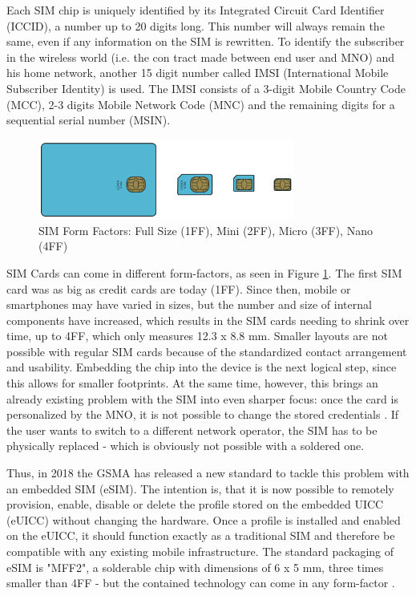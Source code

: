 Each SIM chip is uniquely identified by its Integrated Circuit Card Identifier (ICCID), a number up to 20 digits long. This number will always remain the same, even if any information on the SIM is rewritten. To identify the subscriber in the wireless world (i.e. the con tract made between end user and MNO) and his home network, another 15 digit number called IMSI (International Mobile Subscriber Identity) is used. The IMSI consists of a 3-digit Mobile Country Code (MCC), 2-3 digits Mobile Network Code (MNC) and the remaining digits for a sequential serial number (MSIN).

\begin{figure}[ht]
    \centering
    \includegraphics[width=0.75\textwidth]{pictures/sim_form_factors.png}
    \caption{SIM Form Factors: Full Size (1FF), Mini (2FF), Micro (3FF), Nano (4FF) \parencite{pic:SIMFormfactor}}
    \label{fig:sim-formfactors}
\end{figure}

SIM Cards can come in different form-factors, as seen in Figure \ref{fig:sim-formfactors}. The first SIM card was as big as credit cards are today (1FF). Since then, mobile or smartphones may have varied in sizes, but the number and size of internal components have increased, which results in the SIM cards needing to shrink over time, up to 4FF, which only measures 12.3 x 8.8 mm. Smaller layouts are not possible with regular SIM cards because of the standardized contact arrangement and usability. Embedding the chip into the device is the next logical step, since this allows for smaller footprints. At the same time, however, this brings an already existing problem with the SIM into even sharper focus: once the card is personalized by the MNO, it is not possible to change the stored credentials \parencite{Meyer:eSIMOverview}. If the user wants to switch to a different network operator, the SIM has to be physically replaced - which is obviously not possible with a soldered one. 

Thus, in 2018 the GSMA has released a new standard to tackle this problem with an embedded SIM (eSIM). The intention is, that it is now possible to remotely provision, enable, disable or delete the profile stored on the embedded UICC (eUICC) without changing the hardware. Once a profile is installed and enabled on the eUICC, it should function exactly as a traditional SIM and therefore be compatible with any existing mobile infrastructure. The standard packaging of eSIM is "MFF2", a solderable chip with dimensions of 6 x 5 mm, three times smaller than 4FF - but the contained technology can come in any form-factor \cite{1ot:SIMtypes}.

